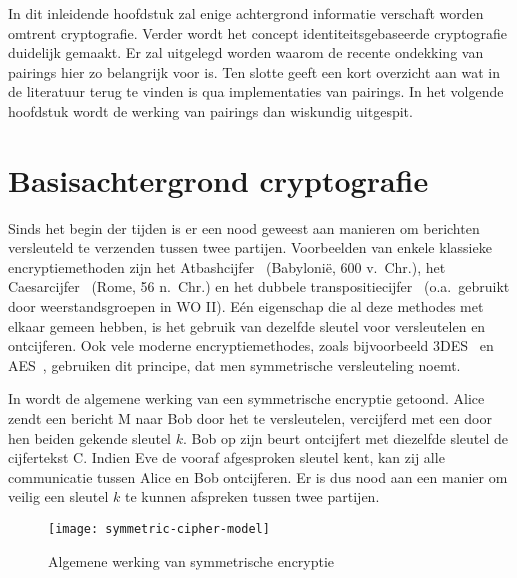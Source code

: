 
 In dit inleidende hoofdstuk zal enige achtergrond informatie verschaft worden omtrent cryptografie. Verder wordt het concept identiteitsgebaseerde cryptografie duidelijk gemaakt. Er zal uitgelegd worden waarom de recente ondekking van pairings hier zo belangrijk voor is. Ten slotte geeft een kort overzicht aan wat in de literatuur terug te vinden is qua implementaties van pairings. In het volgende hoofdstuk wordt de werking van pairings dan wiskundig uitgespit.

\section{Basisachtergrond cryptografie}

Sinds het begin der tijden is er een nood geweest aan manieren om berichten versleuteld te verzenden tussen twee partijen. Voorbeelden van enkele klassieke encryptiemethoden zijn het Atbashcijfer~\cite{athbash} (Babyloni\"e, 600 v.\ Chr.), het Caesarcijfer~\cite{caesar} (Rome, 56 n.\ Chr.) en het dubbele transpositiecijfer~\cite{kahn} (o.a.\ gebruikt door weerstandsgroepen in WO II). E\'en eigenschap die al deze methodes met elkaar gemeen hebben, is het gebruik van dezelfde sleutel voor versleutelen en ontcijferen. Ook vele moderne encryptiemethodes, zoals bijvoorbeeld 3DES~\cite{3des} en AES~\cite{aes}, gebruiken dit principe, dat men symmetrische versleuteling noemt.

In  wordt de algemene werking van een symmetrische encryptie getoond. Alice zendt een bericht M naar Bob door het te versleutelen, vercijferd met een door hen beiden gekende sleutel $k$. Bob op zijn beurt ontcijfert met diezelfde sleutel de cijfertekst C. Indien Eve de vooraf afgesproken sleutel kent, kan zij alle communicatie tussen Alice en Bob ontcijferen. Er is dus nood aan een manier om veilig een sleutel $k$ te kunnen afspreken tussen twee partijen.

\begin{figure}[h]
	\centering
		\texttt{[image: symmetric-cipher-model]}
		\caption{Algemene werking van symmetrische encryptie\label{fig-encryptie-applicaties-sym-cipher}}
\end{figure}

